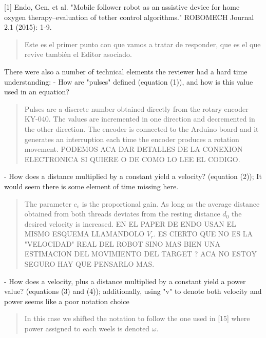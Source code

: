 \documentclass[journal,onecolumn,12pt]{IEEEtran}
\begin{document}
\vspace{2em}

[1]  Endo, Gen, et al. "Mobile follower robot as an assistive device for home oxygen therapy–evaluation of tether control algorithms." ROBOMECH Journal 2.1 (2015): 1-9.

\begin{quotation}
{\color{blue}
Este es el primer punto con que vamos a tratar de responder, que es el que revive también el Editor asociado.
}
\end{quotation}

There were also a number of technical elements the reviewer had a hard time understanding:
- How are "pulses" defined (equation (1)), and how is this value used in an equation?

\begin{quotation}
{\color{blue}
Pulses are a discrete number obtained directly from the rotary encoder KY-040.  The values are incremented in one direction and decremented in the other direction.  The encoder is connected to the Arduino board and it generates an interruption each time the encoder produces a rotation movement.  PODEMOS ACA DAR DETALLES DE LA CONEXION ELECTRONICA SI QUIERE O DE COMO LO LEE EL CODIGO.
}
\end{quotation}


- How does a distance multiplied by a constant yield a velocity? (equation (2)); It would seem there is some element of time missing here.  

\begin{quotation}
{\color{blue}
The parameter $c_v$ is the proportional gain.  As long as the average distance obtained from both threads deviates from the resting distance $d_0$ the desired velocity is increased.
EN EL PAPER DE ENDO USAN EL MISMO ESQUEMA LLAMANDOLO $V_r$.  ES CIERTO QUE NO ES LA "VELOCIDAD" REAL DEL ROBOT SINO MAS BIEN UNA ESTIMACION DEL MOVIMIENTO DEL TARGET ?  ACA NO ESTOY SEGURO HAY QUE PENSARLO MAS.
}
\end{quotation}

- How does a velocity, plus a distance multiplied by a constant yield a power value? (equations (3) and (4)); additionally, using "v" to denote both velocity and power seems like a poor notation choice

\begin{quotation}
{\color{blue}
In this case we shifted the notation to follow the one used in [15] where power assigned to each weels is denoted $\omega$.
}
\end{quotation}
\end{document}

